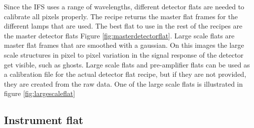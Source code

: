 \documentclass[twoside,single]{lion-msc}
\begin{document}
Since the IFS uses a range of wavelengths, different detector flats are needed to calibrate all pixels properly. The recipe returns the master flat frames for the different lamps that are used. The best flat to use in the rest of the recipes are the master detector flats Figure \ref{fig:masterdetectorflat}. Large scale flats are master flat frames that are smoothed with a gaussian. On this images the large scale structures in pixel to pixel variation in the signal response of the detector get visible, such as ghosts. Large scale flats and pre-amplifier flats can be used as a calibration file for the actual detector flat recipe, but if they are not provided, they are created from the raw data. One of the large scale flats is illustrated in figure \ref{fig:largescaleflat}

\subsection{Instrument flat}
\end{document}
